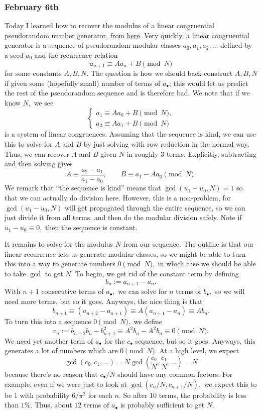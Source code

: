 \subsubsection{February 6th}
Today I learned how to recover the modulus of a linear congruential pseudorandom number generator, from \href{https://security.stackexchange.com/a/4306}{here}. Very quickly, a linear congruential generator is a sequence of pseudorandom modular classes $a_0,a_1,a_2,\ldots$ defined by a seed $a_0$ and the recurrence relation
\[a_{n+1}\equiv Aa_n+B\pmod N\]
for some constants $A,B,N.$ The question is how we should back-construct $A,B,N$ if given some (hopefully small) number of terms of $a_\bullet$; this would let us predict the rest of the pseudorandom sequence and is therefore bad. We note that if we know $N,$ we see
\[\begin{cases}
    a_1\equiv Aa_0+B\pmod N, \\
    a_2\equiv Aa_1+B\pmod N
\end{cases}\]
is a system of linear congruences. Assuming that the sequence is kind, we can use this to solve for $A$ and $B$ by just solving with row reduction in the normal way. Thus, we can recover $A$ and $B$ given $N$ in roughly $3$ terms. Explicitly, subtracting and then solving gives
\[A\equiv\frac{a_2-a_1}{a_1-a_0},\qquad B\equiv a_1-Aa_0\pmod N.\]
We remark that ``the sequence is kind'' means that $\gcd(u_1-u_0,N)=1$ so that we can actually do division here. However, this is a non-problem, for $\gcd(u_1-u_0,N)$ will get propagated through the entire sequence, so we can just divide it from all terms, and then do the modular division safely. Note if $u_1-u_0\equiv0,$ then the sequence is constant.

It remains to solve for the modulus $N$ from our sequence. The outline is that our linear recurrence lets us generate modular classes, so we might be able to turn this into a way to generate numbers $0\pmod N,$ in which case we should be able to take $\gcd$ to get $N.$ To begin, we get rid of the constant term by defining
\[b_n:=a_{n+1}-a_n.\]
With $n+1$ consecutive terms of $a_\bullet,$ we can solve for $n$ terms of $b_\bullet,$ so we will need more terms, but so it goes. Anyways, the nice thing is that
\[b_{n+1}\equiv(a_{n+2}-a_{n+1})\equiv A(a_{n+1}-a_n)\equiv Ab_n.\]
To turn this into a sequence $0\pmod N,$ we define
\[c_n:=b_{n+2}b_n-b_{n+1}^2\equiv A^2b_n-A^2b_n\equiv0\pmod N.\]
We need yet another term of $a_\bullet$ for the $c_\bullet$ sequence, but so it goes. Anyways, this generates a lot of numbers which are $0\pmod N.$ At a high level, we expect
\[\gcd(c_0,c_1,\ldots)=N\gcd\left(\frac{c_0}N,\frac{c_1}N,\ldots\right)=N\]
because there's no reason that $c_\bullet/N$ should have any common factors. For example, even if we were just to look at $\gcd(c_n/N,c_{n+1}/N),$ we expect this to be $1$ with probability $6/\pi^2$ for each $n.$ So after $10$ terms, the probability is less than $1\%.$ Thus, about $12$ terms of $a_\bullet$ is probably sufficient to get $N.$

